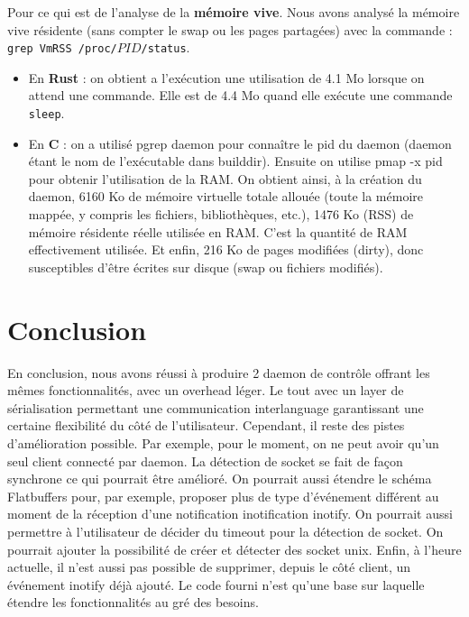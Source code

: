 \documentclass{article}
\begin{document}
Pour ce qui est de l'analyse de la \textbf{mémoire vive}. Nous avons analysé la mémoire vive résidente (sans compter le swap ou les pages partagées) avec la commande : \texttt{grep VmRSS /proc/$PID$/status}.
\begin{itemize}
    \item En \textbf{Rust} : on obtient a l'exécution une utilisation de 4.1 Mo lorsque on attend une commande. Elle est de 4.4 Mo quand elle exécute une commande \texttt{sleep}.
    \item En \textbf{C} : on a utilisé pgrep daemon pour connaître le pid du daemon (daemon étant le nom de l'exécutable dans builddir). Ensuite on utilise pmap -x pid pour obtenir l'utilisation de la RAM. On obtient ainsi, à la création du daemon, 6160 Ko de mémoire virtuelle totale allouée (toute la mémoire mappée, y compris les fichiers, bibliothèques, etc.), 1476 Ko (RSS) de mémoire résidente réelle utilisée en RAM. C’est la quantité de RAM effectivement utilisée. Et enfin, 216 Ko de pages modifiées (dirty), donc susceptibles d’être écrites sur disque (swap ou fichiers modifiés).
\end{itemize}

\section{Conclusion}

En conclusion, nous avons réussi à produire 2 daemon de contrôle offrant les mêmes fonctionnalités, avec un overhead léger. Le tout avec un layer de sérialisation permettant une communication interlanguage garantissant une certaine flexibilité du côté de l'utilisateur. Cependant, il reste des pistes d'amélioration possible. Par exemple, pour le moment, on ne peut avoir qu'un seul client connecté par daemon. La détection de socket se fait de façon synchrone ce qui pourrait être amélioré. On pourrait aussi étendre le schéma Flatbuffers pour, par exemple, proposer plus de type d'événement différent au moment de la réception d'une notification inotification inotify. On pourrait aussi permettre à l'utilisateur de décider du timeout pour la détection de socket. On pourrait ajouter la possibilité de créer et détecter des socket unix. Enfin, à l'heure actuelle, il n'est aussi pas possible de supprimer, depuis le côté client, un événement inotify déjà ajouté. Le code fourni n'est qu'une base sur laquelle étendre les fonctionnalités au gré des besoins.   
\end{document}
